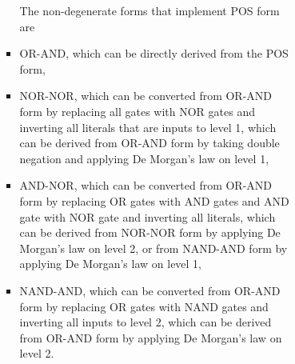 \documentclass[a4paper,12pt]{article}
\begin{document}
\begin{itemize}
\begin{itemize}
\begin{itemize}
\begin{itemize}
\begin{itemize}
\begin{itemize}
\begin{itemize}
The non-degenerate forms that implement POS form are
\bit
\item OR-AND, which can be directly derived from the POS form,
\item NOR-NOR, which can be converted from OR-AND form by replacing all gates with NOR gates and inverting all literals that are inputs to level 1, which can be derived from OR-AND form by taking double negation and applying De Morgan's law on level 1,
\item AND-NOR, which can be converted from OR-AND form by replacing OR gates with AND gates and AND gate with NOR gate and inverting all literals, which can be derived from NOR-NOR form by applying De Morgan's law on level 2, or from NAND-AND form by applying De Morgan's law on level 1,
\item NAND-AND, which can be converted from OR-AND form by replacing OR gates with NAND gates and inverting all inputs to level 2, which can be derived from OR-AND form by applying De Morgan's law on level 2.
\eit


\end{itemize}
\end{itemize}
\end{itemize}
\end{itemize}
\end{itemize}
\end{itemize}
\end{itemize}
\end{document}

